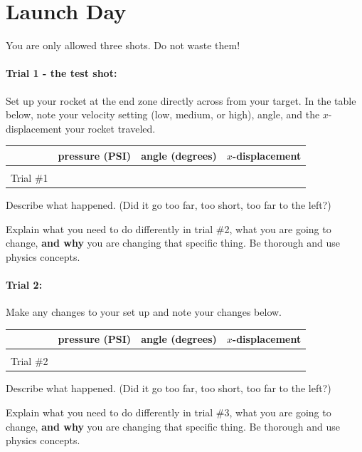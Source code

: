 \documentclass[10pt]{exam}
\begin{document}
\section*{Launch Day}

You are only allowed three shots.  Do not waste them!

\paragraph{Trial 1 - the test shot:}  Set up your rocket at the end zone directly across from your target.  In the table below, note your velocity setting (low, medium, or high), angle, and the $x$-displacement your rocket traveled.

\noindent
\begin{tabular}{|*4{l|}}
  \hline
  & pressure (PSI) & angle (degrees) & $x$-displacement\\\hline
  &&& \\
  Trial \#1 &&& \\
  \hline
\end{tabular}

\noindent
Describe what happened. (Did it go too far, too short, too far to the left?)
\vs

\noindent
Explain what you need to do differently in trial \#2, what you are going to change, {\bf and why} you are changing that specific thing.  Be thorough and use physics concepts.
\vs


\paragraph{Trial 2:}  Make any changes to your set up and note your changes below.

\noindent
\begin{tabular}{|*4{l|}}
  \hline
  & pressure (PSI) & angle (degrees) & $x$-displacement\\\hline
  &&& \\
  Trial \#2 &&& \\
  \hline
\end{tabular}

\noindent
Describe what happened. (Did it go too far, too short, too far to the left?)
\vs

\noindent
Explain what you need to do differently in trial \#3, what you are going to change, {\bf and why} you are changing that specific thing.  Be thorough and use physics concepts.
\vs

\pagebreak
\end{document}
